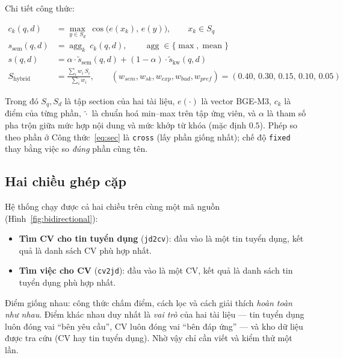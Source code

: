 \documentclass[a4paper,11pt]{article}
\begin{document}
Chi tiết công thức:

\begin{align}
  c_k(q,d) &= \max_{y\in S_d}\ \cos\big(e(x_k),\,e(y)\big),
      \qquad x_k\in S_q \label{eq:sec}\\
  s_{\text{sem}}(q,d) &= \operatorname{agg}_{k}\ c_k(q,d), \qquad
      \operatorname{agg}\in\{\max,\operatorname{mean}\} \label{eq:sem}\\
  s(q,d) &= \alpha\cdot\widetilde{s}_{\text{sem}}(q,d) + (1-\alpha)\cdot\widetilde{s}_{\text{kw}}(q,d)
      \label{eq:fuse}\\
  S_{\text{hybrid}} &= \frac{\sum_i w_i\,S_i}{\sum_i w_i}, \qquad
      (w_{sem},w_{sk},w_{exp},w_{bud},w_{pref}) = (0.40,\,0.30,\,0.15,\,0.10,\,0.05)
      \label{eq:hybrid}
\end{align}

Trong đó $S_q,S_d$ là tập section của hai tài liệu, $e(\cdot)$ là vector BGE-M3, $c_k$
là điểm của từng phần, $\widetilde{\cdot}$ là chuẩn hoá min--max trên tập ứng viên, và
$\alpha$ là tham số pha trộn giữa mức hợp nội dung và mức khớp từ khóa (mặc định $0.5$).
Phép so theo phần ở Công thức~\eqref{eq:sec} là \texttt{cross} (lấy phần giống nhất);
chế độ \texttt{fixed} thay bằng việc so \emph{đúng} phần cùng tên.

\subsection{Hai chiều ghép cặp}
\label{sec:hai-chieu}

Hệ thống chạy được cả hai chiều trên cùng một mã nguồn (Hình~\ref{fig:bidirectional}):

\begin{itemize}[leftmargin=1.2em]
  \item \textbf{Tìm CV cho tin tuyển dụng} (\texttt{jd2cv}): đầu vào là một tin tuyển
        dụng, kết quả là danh sách CV phù hợp nhất.
  \item \textbf{Tìm việc cho CV} (\texttt{cv2jd}): đầu vào là một CV, kết quả là danh
        sách tin tuyển dụng phù hợp nhất.
\end{itemize}



Điểm giống nhau: công thức chấm điểm, cách lọc và cách giải thích \emph{hoàn toàn như
nhau}. Điểm khác nhau duy nhất là \emph{vai trò} của hai tài liệu --- tin tuyển dụng
luôn đóng vai ``bên yêu cầu'', CV luôn đóng vai ``bên đáp ứng'' --- và kho dữ liệu được
tra cứu (CV hay tin tuyển dụng). Nhờ vậy chỉ cần viết và kiểm thử một lần.
\end{document}
